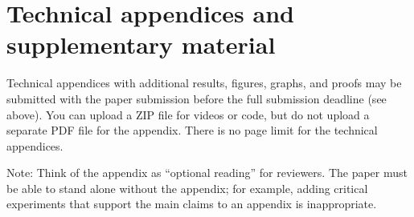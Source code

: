 \documentclass{article}
\begin{document}
\appendix

\section{Technical appendices and supplementary material}
Technical appendices with additional results, figures, graphs, and proofs may be submitted with the paper submission before the full submission deadline (see above). You can upload a ZIP file for videos or code, but do not upload a separate PDF file for the appendix. There is no page limit for the technical appendices. 

Note: Think of the appendix as ``optional reading'' for reviewers. The paper must be able to stand alone without the appendix; for example, adding critical experiments that support the main claims to an appendix is inappropriate. 
\end{document}
